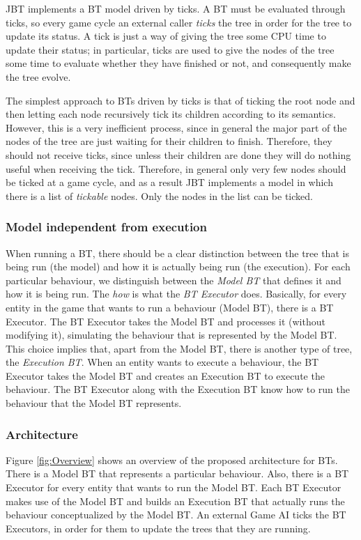 \documentclass[a4paper,10pt]{article}
\begin{document}
JBT implements a BT model driven by ticks. A BT must be evaluated through ticks, so every game cycle an external caller \textit{ticks} the tree in order for the tree to update its status. A tick is just a way of giving the tree some CPU time to update their status; in particular, ticks are used to give the nodes of the tree some time to evaluate whether they have finished or not, and consequently make the tree evolve.

The simplest approach to BTs driven by ticks is that of ticking the root node and then letting each node recursively tick its children according to its semantics. However, this is a very inefficient process, since in general the major part of the nodes of the tree are just waiting for their children to finish. Therefore, they should not receive ticks, since unless their children are done they will do nothing useful when receiving the tick. Therefore, in general only very few nodes should be ticked at a game cycle, and as a result JBT implements a model in which there is a list of \textit{tickable} nodes. Only the nodes in the list can be ticked.

\subsubsection{Model independent from execution}

When running a BT, there should be a clear distinction between the tree that is being run (the model) and how it is actually being run (the execution). For each particular behaviour, we distinguish between the \textit{Model BT} that defines it and how it is being run. The \textit{how} is what the \textit{BT Executor} does. Basically, for every entity in the game that wants to run a behaviour (Model BT), there is a BT Executor. The BT Executor takes the Model BT and processes it (without modifying it), simulating the behaviour that is represented by the Model BT. This choice implies that, apart from the Model BT, there is another type of tree, the \textit{Execution BT}. When an entity wants to execute a behaviour, the BT Executor takes the Model BT and creates an Execution BT to execute the behaviour. The BT Executor along with the Execution BT know how to run the behaviour that the Model BT represents.

\subsubsection{Architecture}

Figure \ref{fig:Overview} shows an overview of the proposed architecture for BTs. There is a Model BT that represents a particular behaviour. Also, there is a BT Executor for every entity that wants to run the Model BT. Each BT Executor makes use of the Model BT and builds an Execution BT that actually runs the behaviour conceptualized by the Model BT. An external Game AI ticks the BT Executors, in order for them to update the trees that they are running.
\end{document}
